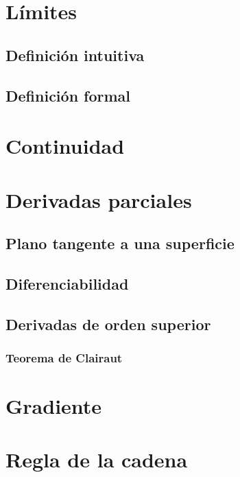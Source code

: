 \documentclass[12pt, fleqn]{report}                             %
\theoremstyle{break}                                            %
\begin{document}
        \section{Límites}
            
            \subsection{Definición intuitiva}
            
            \subsection{Definición formal}
            
        \section{Continuidad}
        
        \section{Derivadas parciales}
        
            \subsection{Plano tangente a una superficie}
            
            \subsection{Diferenciabilidad}
            
            \subsection{Derivadas de orden superior}
            
                \subsubsection{Teorema de Clairaut}
                
        \section{Gradiente}
                
        \section{Regla de la cadena}
        
\end{document}
